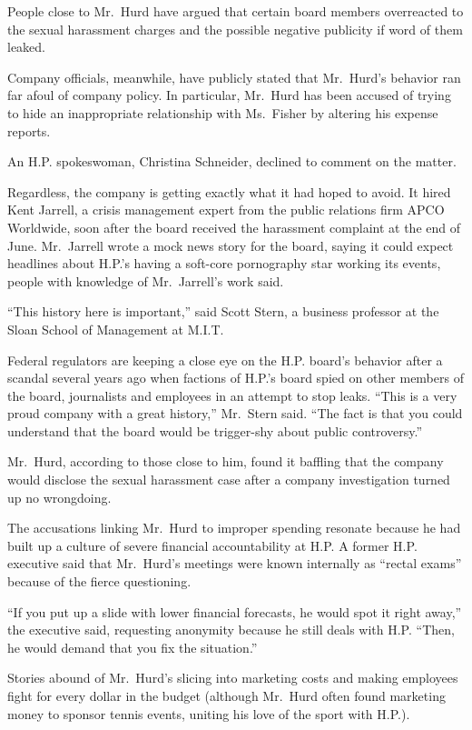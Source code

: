 ﻿\documentclass[12pt]{article}
\begin{document}
People close to Mr.~Hurd have argued that certain board members overreacted to the sexual harassment
charges and the possible negative publicity if word of them leaked.

Company officials, meanwhile, have publicly stated that Mr.~Hurd's behavior ran far afoul of company
policy. In particular, Mr.~Hurd has been accused of trying to hide an inappropriate relationship
with Ms.~Fisher by altering his expense reports.

An H.P. spokeswoman, Christina Schneider, declined to comment on the matter.

Regardless, the company is getting exactly what it had hoped to avoid. It hired Kent Jarrell, a
crisis management expert from the public relations firm APCO Worldwide, soon after the board
received the harassment complaint at the end of June. Mr.~Jarrell wrote a mock news story for the
board, saying it could expect headlines about H.P.'s having a soft-core pornography star working its
events, people with knowledge of Mr.~Jarrell's work said.

``This history here is important,'' said Scott Stern, a business professor at the Sloan School of
Management at M.I.T.

Federal regulators are keeping a close eye on the H.P. board's behavior after a scandal several
years ago when factions of H.P.'s board spied on other members of the board, journalists and
employees in an attempt to stop leaks. ``This is a very proud company with a great history,''
Mr.~Stern said. ``The fact is that you could understand that the board would be trigger-shy about
public controversy.''

Mr.~Hurd, according to those close to him, found it baffling that the company would disclose the
sexual harassment case after a company investigation turned up no wrongdoing.

The accusations linking Mr.~Hurd to improper spending resonate because he had built up a culture of
severe financial accountability at H.P. A former H.P. executive said that Mr.~Hurd's meetings were
known internally as ``rectal exams'' because of the fierce questioning.

``If you put up a slide with lower financial forecasts, he would spot it right away,'' the executive
said, requesting anonymity because he still deals with H.P. ``Then, he would demand that you fix the
situation.''

Stories abound of Mr.~Hurd's slicing into marketing costs and making employees fight for every
dollar in the budget (although Mr.~Hurd often found marketing money to sponsor tennis events,
uniting his love of the sport with H.P.).
\end{document}
